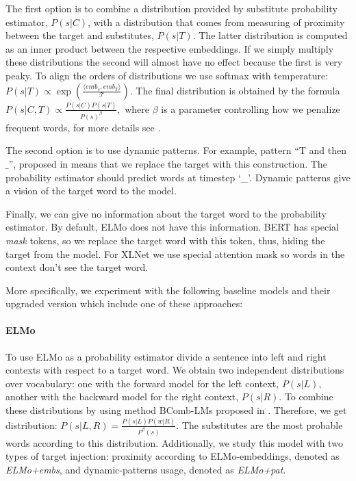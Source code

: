 \documentclass[11pt,a4paper]{article}
\begin{document}
The first option is to combine a distribution provided by substitute probability estimator, $P(s|C)$, with a distribution that comes from measuring of proximity between the target and substitutes, $P(s|T)$. The latter distribution is computed as an inner product between the respective embeddings. If we simply multiply these distributions the second will almost have no effect because the first is very peaky. To align the orders of distributions we use softmax with temperature:
 $   P(s|T) \propto \exp(\frac{\langle emb_s, emb_T\rangle}{\mathcal{T}}).$
The final distribution is obtained by the formula
   $ P(s|C, T) \propto \frac{P(s|C)P(s|T)}{P(s)^\beta},$
where $\beta$ is a parameter controlling how we penalize frequent words, for more details see \cite{ranlp2019}.

The second option is to use dynamic patterns. For example, pattern ``T and then $\_$'', proposed in \cite{arefyev-semeval-2019} means that we replace the target with this construction. The probability estimator should predict words at timestep ‘\_’. Dynamic patterns give a vision of the target word to the model.

Finally, we can give no information about the target word to the probability estimator. By default, ELMo does not have this information. BERT has special {\it mask} tokens, so we replace the target word with this token, thus, hiding the target from the model. For XLNet we use special attention mask so words in the context don't see the target word. 

More specifically, we experiment with the following baseline models and their upgraded version which include one of these approaches:

\paragraph{ELMo} To use ELMo as a probability estimator divide a sentence into left and right contexts with respect to a target word. We obtain two independent distributions over vocabulary: one with the forward model for the left context, $P(s|L)$, another with the backward model for the right context, $P(s|R)$. To combine these distributions by using method BComb-LMs proposed in \cite{ranlp2019}. Therefore, we get distribution: $P(s|L,R) = \frac{P(s|L)P(w|R)}{P^{\beta}(s)}$. The substitutes are the most probable words according to this distribution. Additionally, we study this model with two types of target injection: proximity according to ELMo-embeddings,  denoted as \textit{ELMo+embs}, and dynamic-patterns usage, denoted as \textit{ELMo+pat}.
\end{document}
